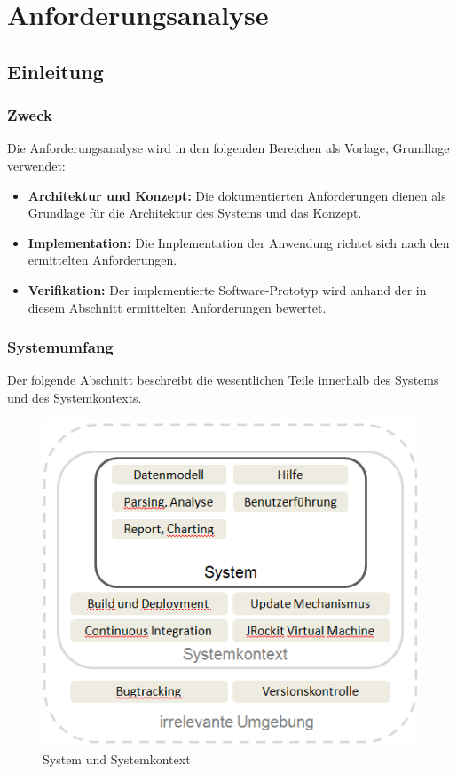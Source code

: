 \chapter{Anforderungsanalyse}\label{anforderungsanalyse}
\section{Einleitung}
\subsection{Zweck}
Die Anforderungsanalyse wird in den folgenden Bereichen als Vorlage, Grundlage verwendet:
\begin{itemize}
	\item \textbf{Architektur und Konzept:}  Die dokumentierten Anforderungen dienen als Grundlage für die Architektur des Systems und das Konzept. 
	\item \textbf{Implementation:} Die Implementation der Anwendung richtet sich nach den ermittelten Anforderungen. 
	\item \textbf{Verifikation:} Der implementierte Software-Prototyp wird anhand der in diesem Abschnitt ermittelten Anforderungen bewertet. 
\end{itemize}

\subsection{Systemumfang}
Der folgende Abschnitt beschreibt die wesentlichen Teile innerhalb des Systems und des Systemkontexts. 
 \begin{figure}[H]
        	\caption{System und Systemkontext}
  	\centering
    	\includegraphics{images/systemumfang}
\end{figure}
